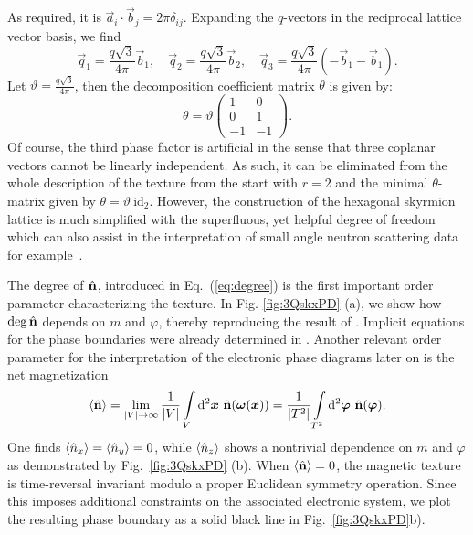 \documentclass[submission, Phys]{SciPost}
\begin{document}
As required, it is $\vec{a}_i\cdot \vec{b}_j=2\pi\delta_{ij}$. 
Expanding the $q$-vectors in the reciprocal lattice vector basis, we find
\begin{equation}
    \vec{q}_1 = \frac{q\sqrt{3}}{4\pi} \vec{b}_1, \quad \vec{q}_2 = \frac{q\sqrt{3}}{4\pi} \vec{b}_2, \quad \vec{q}_3 = \frac{q\sqrt{3}}{4\pi} (-\vec{b}_1-\vec{b}_1).
\end{equation}
Let $\vartheta=\frac{q\sqrt{3}}{4\pi}$, then the decomposition coefficient matrix $\theta$ is given by:
\begin{equation}
    \theta = \vartheta \begin{pmatrix} 1 & 0 \\ 0 & 1 \\ -1 & -1 \end{pmatrix}.
\end{equation}
Of course, the third phase factor is artificial in the sense that three coplanar vectors cannot be linearly independent. 
As such, it can be eliminated from the whole description of the texture from the start with $r=2$ and the minimal $\theta$-matrix given by $\theta= \vartheta~\mathrm{id}_2$.
However, the construction of the hexagonal skyrmion lattice is much simplified with the superfluous, yet helpful degree of freedom which can also assist in the interpretation of small angle neutron scattering data for example~\cite{Muhlbauer2009}.

\figureI
\figureII

The degree of $\hat{\mathbf{n}}$, introduced in Eq.~(\ref{eq:degree}) is the first important order parameter characterizing the texture.
In Fig. \ref{fig:3QskxPD} (a), we show how $\deg \hat{\mathbf{n}}$ depends on $m$ and $\varphi$, thereby reproducing the result of \cite[Fig.~6]{Shimizu2022}.
Implicit equations for the phase boundaries were already determined in \cite[Eq.~(29)]{Shimizu2022}.
Another relevant order parameter for the interpretation of the electronic phase diagrams later on is the net magnetization
\begin{align}
    \braket{\hat{\mathbf{n}}} = \lim\limits_{|V|\to\infty} \frac{1}{|V|} \int\limits_V \mathrm{d}^2 \boldsymbol{x} ~ \hat{\mathbf{n}}(\boldsymbol{\omega}(\boldsymbol{x})) =\frac{1}{|T^2|}
\int\limits_{T^2}\mathrm{d}^2\boldsymbol{\varphi} ~ \hat{\mathbf{n}}(\boldsymbol{\varphi}).
\label{eq:magnetization_formula}
\end{align}
One finds $\braket{\hat{n}_x} =\braket{\hat{n}_y}=0$, while $\braket{\hat{n}_z}$ shows a nontrivial dependence on $m$ and $\varphi$ as demonstrated by Fig.~\ref{fig:3QskxPD} (b).
When $\braket{\hat{\mathbf{n}}} = 0$, the magnetic texture is time-reversal invariant modulo a proper Euclidean symmetry operation. 
Since this imposes additional constraints on the associated electronic system, we plot the resulting phase boundary as a solid black line in Fig.~\ref{fig:3QskxPD}b).
\end{document}
